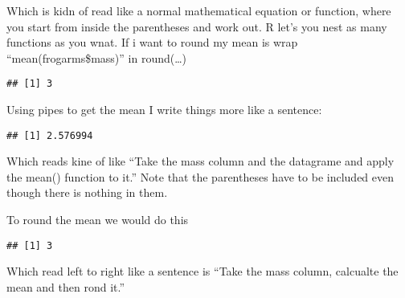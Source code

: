 \documentclass[
]{book}
\newenvironment{Shaded}{\begin{snugshade}}{\end{snugshade}}
\newcommand{\CommentTok}[1]{\textcolor[rgb]{0.56,0.35,0.01}{\textit{#1}}}
\newcommand{\FunctionTok}[1]{\textcolor[rgb]{0.00,0.00,0.00}{#1}}
\newcommand{\NormalTok}[1]{#1}
\newcommand{\SpecialCharTok}[1]{\textcolor[rgb]{0.00,0.00,0.00}{#1}}
\begin{document}
Which is kidn of read like a normal mathematical equation or function, where you start from inside the parentheses and work out. R let's you nest as many functions as you wnat. If i want to round my mean is wrap ``mean(frogarms\$mass)'' in round(\ldots)

\begin{Shaded}
\end{Shaded}

\begin{verbatim}
## [1] 3
\end{verbatim}

Using pipes to get the mean I write things more like a sentence:

\begin{Shaded}
\end{Shaded}

\begin{verbatim}
## [1] 2.576994
\end{verbatim}

Which reads kine of like ``Take the mass column and the datagrame and apply the mean() function to it.'' Note that the parentheses have to be included even though there is nothing in them.

To round the mean we would do this

\begin{Shaded}
\end{Shaded}

\begin{verbatim}
## [1] 3
\end{verbatim}

Which read left to right like a sentence is ``Take the mass column, calcualte the mean and then rond it.''
\end{document}
